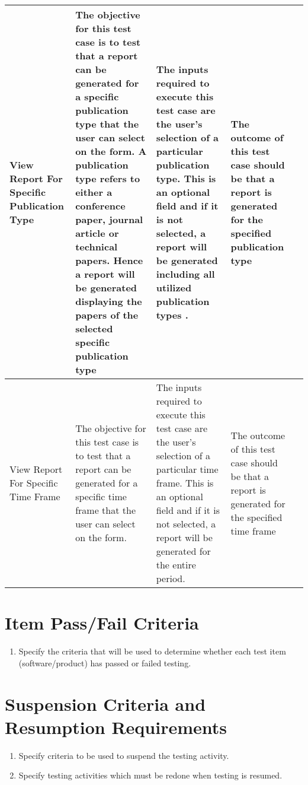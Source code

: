 \begin{tabular}{ L{3cm}| L{3cm}| L{3cm}| L{3cm}| L{0cm}} 
\hline 
View Report For Specific Publication Type &  
The objective for this test case is to test that a report can be generated for a specific publication type that the user can select on the form. A publication type refers to either a conference paper, journal article or technical papers. Hence a report will be generated displaying the papers of the selected specific publication type & 
	The inputs required to execute this test case are the user's selection of a particular publication type. This is an optional field and if it is not selected, a report will be generated including all utilized publication types . & 
	The outcome of this test case should be that a report is generated for the specified publication type& \\ 
\hline 
View Report For Specific Time Frame &  
The objective for this test case is to test that a report can be generated for a specific time frame that the user can select on the form. & 
	The inputs required to execute this test case are the user's selection of a particular time frame. This is an optional field and if it is not selected, a report will be generated for the entire period. & 
	The outcome of this test case should be that a report is generated for the specified time frame& \\ 
\hline
	 
\end{tabular}

\section{Item Pass/Fail Criteria}
   
\begin{enumerate}
	\item Specify the criteria that will be used to determine whether each test item (software/product) has passed or failed testing.
\end{enumerate}

\section{Suspension Criteria and Resumption Requirements}

\begin{enumerate}
	\item Specify criteria to be used to suspend the testing activity.
	\item Specify testing activities which must be redone when testing is resumed.
\end{enumerate}

